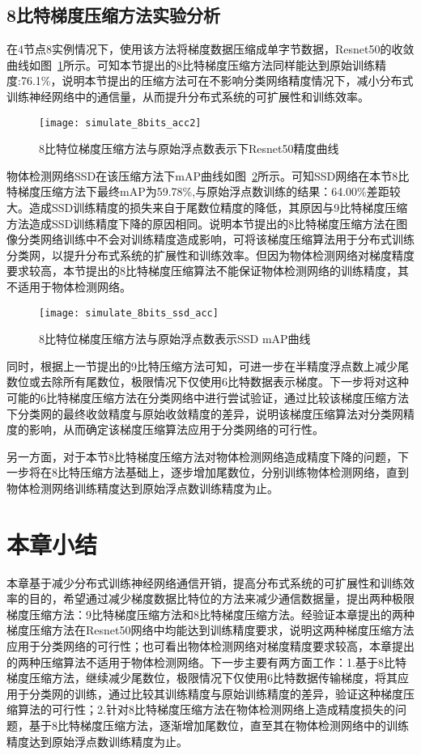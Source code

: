 \subsection{8比特梯度压缩方法实验分析}
在4节点8实例情况下，使用该方法将梯度数据压缩成单字节数据，Resnet50的收敛曲线如图~\ref{fig:simulate_8bits_acc}所示。可知本节提出的8比特梯度压缩方法同样能达到原始训练精度:76.1\%，说明本节提出的压缩方法可在不影响分类网络精度情况下，减小分布式训练神经网络中的通信量，从而提升分布式系统的可扩展性和训练效率。
\begin{figure}[htp]
\centering
\texttt{[image: simulate\_8bits\_acc2]}
\caption{8比特位梯度压缩方法与原始浮点数表示下Resnet50精度曲线}
\label{fig:simulate_8bits_acc}
\end{figure}

物体检测网络SSD在该压缩方法下mAP曲线如图~\ref{fig:simulate_8bits_ssd_acc}所示。可知SSD网络在本节8比特梯度压缩方法下最终mAP为59.78\%,与原始浮点数训练的结果：64.00\%差距较大。造成SSD训练精度的损失来自于尾数位精度的降低，其原因与9比特梯度压缩方法造成SSD训练精度下降的原因相同。说明本节提出的8比特梯度压缩方法在图像分类网络训练中不会对训练精度造成影响，可将该梯度压缩算法用于分布式训练分类网，以提升分布式系统的扩展性和训练效率。但因为物体检测网络对梯度精度要求较高，本节提出的8比特梯度压缩算法不能保证物体检测网络的训练精度，其不适用于物体检测网络。
\begin{figure}[htp]
\centering
\texttt{[image: simulate\_8bits\_ssd\_acc]}
\caption{8比特位梯度压缩方法与原始浮点数表示SSD mAP曲线}
\label{fig:simulate_8bits_ssd_acc}
\end{figure}

同时，根据上一节提出的9比特压缩方法可知，可进一步在半精度浮点数上减少尾数位或去除所有尾数位，极限情况下仅使用6比特数据表示梯度。下一步将对这种可能的6比特梯度压缩方法在分类网络中进行尝试验证，通过比较该梯度压缩方法下分类网的最终收敛精度与原始收敛精度的差异，说明该梯度压缩算法对分类网精度的影响，从而确定该梯度压缩算法应用于分类网络的可行性。

另一方面，对于本节8比特梯度压缩方法对物体检测网络造成精度下降的问题，下一步将在8比特压缩方法基础上，逐步增加尾数位，分别训练物体检测网络，直到物体检测网络训练精度达到原始浮点数训练精度为止。
\section{本章小结}
本章基于减少分布式训练神经网络通信开销，提高分布式系统的可扩展性和训练效率的目的，希望通过减少梯度数据比特位的方法来减少通信数据量，提出两种极限梯度压缩方法：9比特梯度压缩方法和8比特梯度压缩方法。经验证本章提出的两种梯度压缩方法在Resnet50网络中均能达到训练精度要求，说明这两种梯度压缩方法应用于分类网络的可行性；也可看出物体检测网络对梯度精度要求较高，本章提出的两种压缩算法不适用于物体检测网络。下一步主要有两方面工作：1.基于8比特梯度压缩方法，继续减少尾数位，极限情况下仅使用6比特数据传输梯度，将其应用于分类网的训练，通过比较其训练精度与原始训练精度的差异，验证这种梯度压缩算法的可行性；2.针对8比特梯度压缩方法在物体检测网络上造成精度损失的问题，基于8比特梯度压缩方法，逐渐增加尾数位，直至其在物体检测网络中的训练精度达到原始浮点数训练精度为止。







